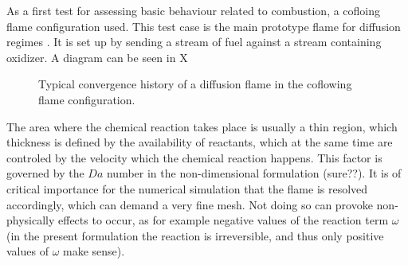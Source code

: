 {As a first test for assessing basic behaviour related to combustion, a cofloing flame configuration used. This test case is the main prototype flame for diffusion regimes \cite{poinsotTheoreticalNumericalCombustion2005}. It is set up by sending a stream of fuel against a stream containing oxidizer. A diagram can be seen in X
\begin{figure}[t!]
	\centering
	\caption{Typical convergence history of a diffusion flame in the coflowing flame configuration. }
	\label{fig:CDF_ConvergenceStory}
\end{figure} 

The area where the chemical reaction takes place is usually a thin region, which thickness is defined by the availability of reactants, which at the same time are controled by the velocity which the chemical reaction happens. This factor is governed by the $Da$ number in the non-dimensional formulation (sure??). It is of critical importance for the numerical simulation that the flame is resolved accordingly, which can demand a very fine mesh. Not doing so can provoke non-physically effects to occur, as for example negative values of the reaction term $\omega$ (in the present formulation the reaction is irreversible, and thus only positive values of $\omega$ make sense). 

}
